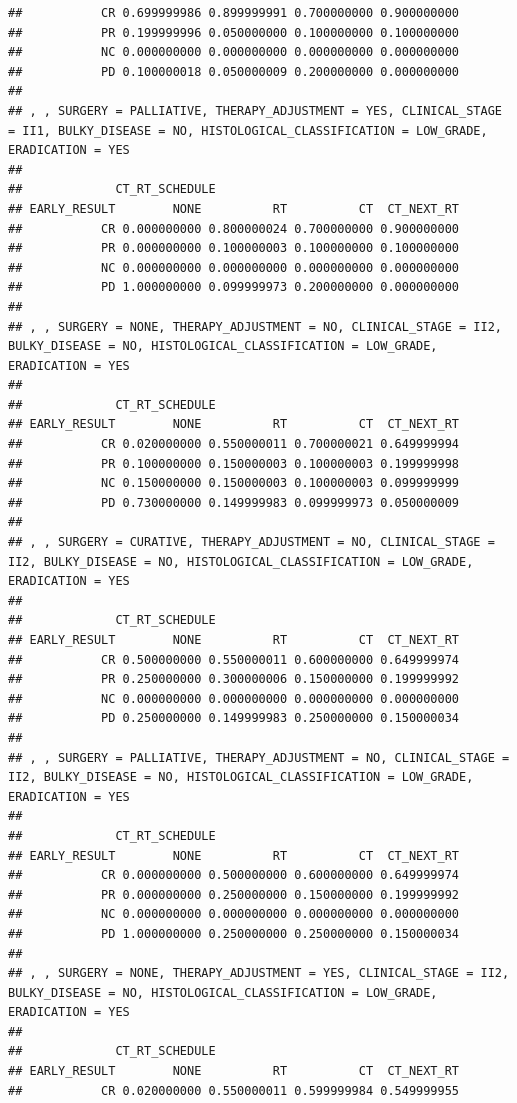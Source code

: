 \documentclass[]{article}
\begin{document}
\begin{verbatim}
##           CR 0.699999986 0.899999991 0.700000000 0.900000000
##           PR 0.199999996 0.050000000 0.100000000 0.100000000
##           NC 0.000000000 0.000000000 0.000000000 0.000000000
##           PD 0.100000018 0.050000009 0.200000000 0.000000000
## 
## , , SURGERY = PALLIATIVE, THERAPY_ADJUSTMENT = YES, CLINICAL_STAGE = II1, BULKY_DISEASE = NO, HISTOLOGICAL_CLASSIFICATION = LOW_GRADE, ERADICATION = YES
## 
##             CT_RT_SCHEDULE
## EARLY_RESULT        NONE          RT          CT  CT_NEXT_RT
##           CR 0.000000000 0.800000024 0.700000000 0.900000000
##           PR 0.000000000 0.100000003 0.100000000 0.100000000
##           NC 0.000000000 0.000000000 0.000000000 0.000000000
##           PD 1.000000000 0.099999973 0.200000000 0.000000000
## 
## , , SURGERY = NONE, THERAPY_ADJUSTMENT = NO, CLINICAL_STAGE = II2, BULKY_DISEASE = NO, HISTOLOGICAL_CLASSIFICATION = LOW_GRADE, ERADICATION = YES
## 
##             CT_RT_SCHEDULE
## EARLY_RESULT        NONE          RT          CT  CT_NEXT_RT
##           CR 0.020000000 0.550000011 0.700000021 0.649999994
##           PR 0.100000000 0.150000003 0.100000003 0.199999998
##           NC 0.150000000 0.150000003 0.100000003 0.099999999
##           PD 0.730000000 0.149999983 0.099999973 0.050000009
## 
## , , SURGERY = CURATIVE, THERAPY_ADJUSTMENT = NO, CLINICAL_STAGE = II2, BULKY_DISEASE = NO, HISTOLOGICAL_CLASSIFICATION = LOW_GRADE, ERADICATION = YES
## 
##             CT_RT_SCHEDULE
## EARLY_RESULT        NONE          RT          CT  CT_NEXT_RT
##           CR 0.500000000 0.550000011 0.600000000 0.649999974
##           PR 0.250000000 0.300000006 0.150000000 0.199999992
##           NC 0.000000000 0.000000000 0.000000000 0.000000000
##           PD 0.250000000 0.149999983 0.250000000 0.150000034
## 
## , , SURGERY = PALLIATIVE, THERAPY_ADJUSTMENT = NO, CLINICAL_STAGE = II2, BULKY_DISEASE = NO, HISTOLOGICAL_CLASSIFICATION = LOW_GRADE, ERADICATION = YES
## 
##             CT_RT_SCHEDULE
## EARLY_RESULT        NONE          RT          CT  CT_NEXT_RT
##           CR 0.000000000 0.500000000 0.600000000 0.649999974
##           PR 0.000000000 0.250000000 0.150000000 0.199999992
##           NC 0.000000000 0.000000000 0.000000000 0.000000000
##           PD 1.000000000 0.250000000 0.250000000 0.150000034
## 
## , , SURGERY = NONE, THERAPY_ADJUSTMENT = YES, CLINICAL_STAGE = II2, BULKY_DISEASE = NO, HISTOLOGICAL_CLASSIFICATION = LOW_GRADE, ERADICATION = YES
## 
##             CT_RT_SCHEDULE
## EARLY_RESULT        NONE          RT          CT  CT_NEXT_RT
##           CR 0.020000000 0.550000011 0.599999984 0.549999955

\end{verbatim}
\end{document}
